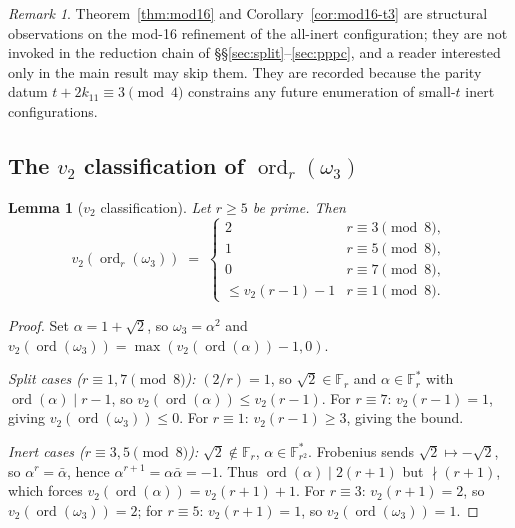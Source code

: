 \documentclass[11pt]{amsart}
\theoremstyle{plain}
\newtheorem{lemma}[theorem]{Lemma}
\theoremstyle{definition}
\theoremstyle{remark}
\newtheorem*{remarknonum}{Remark}
\numberwithin{equation}{section}
\newcommand{\ord}{\operatorname{ord}}
\newcommand{\F}{\mathbb{F}}
\begin{document}
\begin{remarknonum}
Theorem~\ref{thm:mod16} and Corollary~\ref{cor:mod16-t3} are structural observations on the mod-16 refinement of the all-inert configuration; they are not invoked in the reduction chain of \S\S\ref{sec:split}--\ref{sec:pppc}, and a reader interested only in the main result may skip them. They are recorded because the parity datum $t + 2 k_{11} \equiv 3 \pmod 4$ constrains any future enumeration of small-$t$ inert configurations.
\end{remarknonum}

\subsection{The \texorpdfstring{$v_2$}{v2} classification of \texorpdfstring{$\ord_r(\omega_3)$}{ord r(omega 3)}}

\begin{lemma}[$v_2$ classification]\label{lem:v2-class}
Let $r \geq 5$ be prime. Then
\[
  v_2(\ord_r(\omega_3)) \;=\; \begin{cases}
    2 & r \equiv 3 \pmod 8, \\
    1 & r \equiv 5 \pmod 8, \\
    0 & r \equiv 7 \pmod 8, \\
    \leq v_2(r - 1) - 1 & r \equiv 1 \pmod 8.
  \end{cases}
\]
\end{lemma}

\begin{proof}
Set $\alpha = 1 + \sqrt 2$, so $\omega_3 = \alpha^2$ and $v_2(\ord(\omega_3)) = \max(v_2(\ord(\alpha)) - 1, 0)$.

\emph{Split cases ($r \equiv 1, 7 \pmod 8$):} $(2/r) = 1$, so $\sqrt 2 \in \F_r$ and $\alpha \in \F_r^\ast$ with $\ord(\alpha) \mid r - 1$, so $v_2(\ord(\alpha)) \leq v_2(r - 1)$. For $r \equiv 7$: $v_2(r - 1) = 1$, giving $v_2(\ord(\omega_3)) \leq 0$. For $r \equiv 1$: $v_2(r - 1) \geq 3$, giving the bound.

\emph{Inert cases ($r \equiv 3, 5 \pmod 8$):} $\sqrt 2 \notin \F_r$, $\alpha \in \F_{r^2}^\ast$. Frobenius sends $\sqrt 2 \mapsto -\sqrt 2$, so $\alpha^r = \bar\alpha$, hence $\alpha^{r+1} = \alpha \bar\alpha = -1$. Thus $\ord(\alpha) \mid 2(r+1)$ but $\nmid (r+1)$, which forces $v_2(\ord(\alpha)) = v_2(r+1) + 1$. For $r \equiv 3$: $v_2(r+1) = 2$, so $v_2(\ord(\omega_3)) = 2$; for $r \equiv 5$: $v_2(r+1) = 1$, so $v_2(\ord(\omega_3)) = 1$.
\end{proof}
\end{document}
